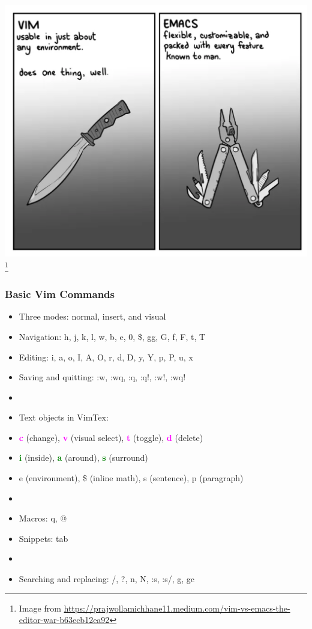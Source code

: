 \documentclass[9pt,table,xcolor=dvipsnames]{beamer}%
\theoremstyle{definition}
\theoremstyle{plain}
\begin{document}
\begin{frame}[fragile,t] %
  \includegraphics[scale=0.18]{./figs/Vim_vs_Emas.png}
  \footnote{Image from \url{https://prajwollamichhane11.medium.com/vim-vs-emacs-the-editor-war-b63ecb12ea92}}
\end{frame}
\begin{frame}
  \frametitle{Basic Vim Commands}
  \begin{itemize}
    \item Three modes: normal, insert, and visual
    \item Navigation: h, j, k, l, w, b, e, 0, \$, gg, G, f, F, t, T
    \item Editing: i, a, o, I, A, O, r, d, D, y, Y, p, P, u, x
    \item Saving and quitting: :w, :wq, :q, :q!, :w!, :wq!
    \item[] 
    \item Text objects in VimTex:
    \item[] \textcolor{magenta}{\bf c} (change), \textcolor{magenta}{\bf v} (visual
      select), \textcolor{magenta}{\bf t} (toggle), \textcolor{magenta}{\bf d} (delete)
    \item[] \textcolor{green}{\bf i} (inside), \textcolor{green}{\bf a} (around),
      \textcolor{green}{\bf s} (surround)
    \item[] e (environment), \$ (inline math), s (sentence), p (paragraph)
    \item[] 
    \item Macros: q, @
    \item Snippets: tab
    \item[]
    \item Searching and replacing: /, ?, n, N, :s, :s/, g, gc
  \end{itemize}
\end{frame}
\end{document}
